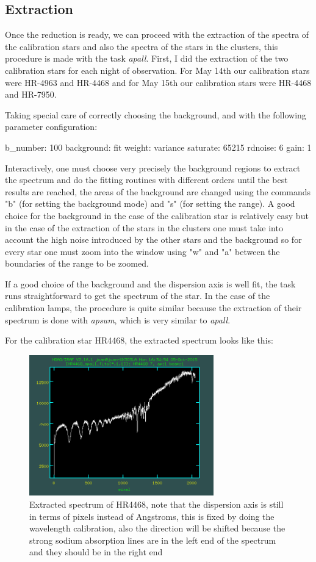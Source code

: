 \subsection{Extraction}

Once the reduction is ready, we can proceed with the extraction of the spectra of the calibration stars and also the spectra of the stars in the clusters, this procedure is made with the task \textit{apall}. First, I did the extraction of the two calibration stars for each night of observation. For May 14th our calibration stars were HR-4963 and HR-4468 and for May 15th our calibration stars were HR-4468 and HR-7950.

Taking special care of correctly choosing the background, and with the following parameter configuration:

b\_number: 100
background: fit
weight: variance
saturate: 65215
rdnoise: 6
gain: 1

Interactively, one must choose very precisely the background regions to extract the spectrum and do the fitting routines with different orders until the best results are reached, the areas of the background are changed using the commands "b" (for setting the background mode) and "s" (for setting the range). A good choice for the background in the case of the calibration star is relatively easy but in the case of the extraction of the stars in the clusters one must take into account the high noise introduced by the other stars and the background so for every star one must zoom into the window using "w" and "a" between the boundaries of the range to be zoomed.

If a good choice of the background and the dispersion axis is well fit, the task runs straightforward to get the spectrum of the star. In the case of the calibration lamps, the procedure is quite similar because the extraction of their spectrum is done with \textit{apsum}, which is very similar to \textit{apall}. 

For the calibration star HR4468, the extracted spectrum looks like this:

\begin{figure}[H]
\centering
\includegraphics[width=8cm]{images/calib_star_apall.png}
\caption[Spectrum of calibration star HR4468]{Extracted spectrum of HR4468, note that the dispersion axis is still in terms of pixels instead of Angstroms, this is fixed by doing the wavelength calibration, also the direction will be shifted because the strong sodium absorption lines are in the left end of the spectrum and they should be in the right end}
\end{figure}

